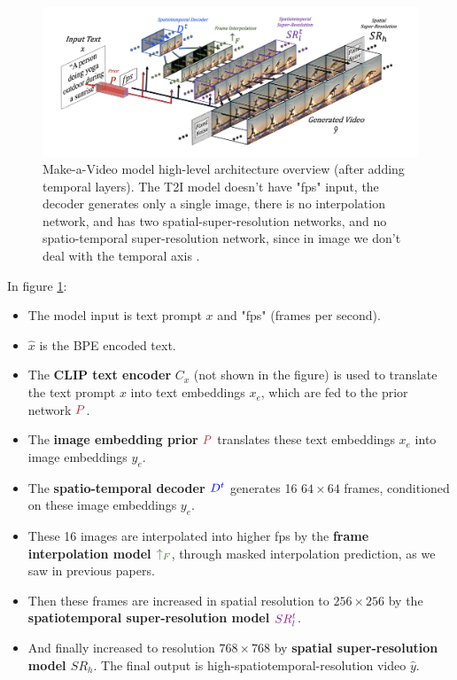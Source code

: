 \begin{figure}
    \centering
    \includegraphics[width=1\textwidth]{images/make_a_video/overview.png}
    \caption{Make-a-Video model high-level architecture overview (after adding temporal layers). The T2I model doesn't have "fps" input, the decoder generates only a single image, there is no interpolation network, and has two spatial-super-resolution networks, and no spatio-temporal super-resolution network, since in image we don't deal with the temporal axis \cite{make_a_video}.}
    \label{fig:make_a_video_overview}
\end{figure}

In figure \ref{fig:make_a_video_overview}:

\begin{itemize}
    \item The model input is text prompt $x$ and "fps" (frames per second).
    \item $\hat{x}$ is the BPE encoded text.
    \item The \textbf{CLIP text encoder} $C_x$ (not shown in the figure) is used to translate the text prompt $x$ into text embeddings $x_e$, which are fed to the prior network $\textcolor{Maroon}{P}$.
    \item The \textbf{image embedding prior} $\textcolor{Maroon}{P}$ translates these text embeddings $x_e$ into image embeddings $y_e$.
    \item The \textbf{spatio-temporal decoder $\textcolor{blue}{D^t}$} generates 16 $64\times 64$ frames, conditioned on these image embeddings $y_e$.
    \item These 16 images are interpolated into higher fps by the \textbf{frame interpolation model $\textcolor{OliveGreen}{\uparrow_F}$}, through masked interpolation prediction, as we saw in previous papers.
    \item Then these frames are increased in spatial resolution to $256\times 256$ by the \textbf{spatiotemporal super-resolution model $\textcolor{Plum}{SR_l^t}$}.
    \item And finally increased to resolution $768\times 768$ by \textbf{spatial super-resolution model $SR_h$}. The final output is high-spatiotemporal-resolution video $\hat{y}$.
\end{itemize}

